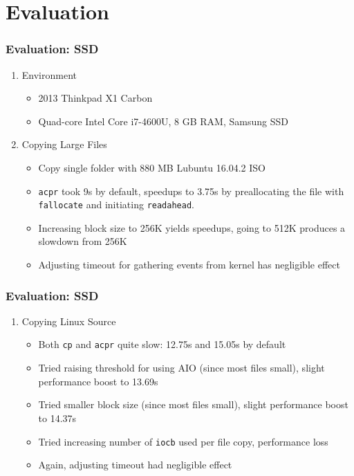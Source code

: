 \documentclass{beamer}
\begin{document}
\section{Evaluation}
\begin{frame}
\frametitle{Evaluation: SSD}
\begin{enumerate}[1.]
	\item{Environment}
	\begin{itemize}
		\item 2013 Thinkpad X1 Carbon
		\item Quad-core Intel Core i7-4600U, 8 GB RAM, Samsung SSD
	\end{itemize}
	\item{Copying Large Files}
	\begin{itemize}
		\item Copy single folder with 880 MB Lubuntu 16.04.2 ISO
		\item \texttt{acpr} took 9s by default, speedups to 3.75s by preallocating the file with \texttt{fallocate} and initiating \texttt{readahead}.
		\item Increasing block size to 256K yields speedups, going to 512K produces a slowdown from 256K
		\item Adjusting timeout for gathering events from kernel has negligible effect
	\end{itemize}
\end{enumerate}
\end{frame}

\begin{frame}
\frametitle{Evaluation: SSD}
\begin{enumerate}[1.]
	\item{Copying Linux Source}
	\begin{itemize}
		\item Both \texttt{cp} and \texttt{acpr} quite slow: 12.75s and 15.05s by default
		\item Tried raising threshold for using AIO (since most files small), slight performance boost to 13.69s
		\item Tried smaller block size (since most files small), slight performance boost to 14.37s
		\item Tried increasing number of \texttt{iocb} used per file copy, performance loss
		\item Again, adjusting timeout had negligible effect
	\end{itemize}
\end{enumerate}
\end{frame}
\end{document}

